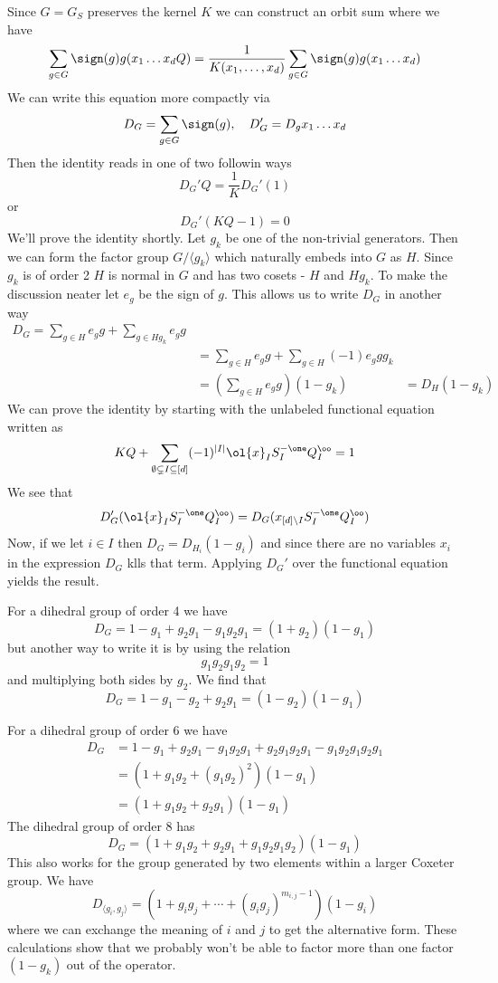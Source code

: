 Since $G = G_S$ preserves the kernel $K$ we can construct an orbit sum where we have
\[
	\sum_{g\in G} \sign(g) g(x_1\ldots x_d Q) = \frac{1}{K(x_1,\ldots,x_d)}\sum_{g\in G} \sign(g) g(x_1\ldots x_d)
\]
We can write this equation more compactly via
\[
	D_G = \sum_{g \in G}\sign(g), \quad D_G' = D_g x_1\ldots x_d
\]
Then the identity reads in one of two followin ways
\[
	D_G'Q = \frac{1}{K}D_G'(1)
\]
or
\[
	D_G'(KQ - 1) = 0
\]
We'll prove the identity shortly. Let $g_k$ be one of the non-trivial generators. Then we can form the factor group $G/\langle g_k \rangle$ which naturally embeds into $G$ as $H$. Since $g_k$ is of order 2 $H$ is normal in $G$ and has two cosets - $H$ and $Hg_k$. To make the discussion neater let $e_g$ be the sign of $g$. This allows us to write $D_G$ in another way
\begin{align*}
	D_G =\sum_{g \in H} e_g g + \sum_{g \in Hg_k} e_g g\\
	&=\sum_{g \in H} e_g g + \sum_{g \in H} (-1)e_g g g_k\\
	&= \left(\sum_{g \in H} e_g g\right)(1-g_k)
	&= D_H(1-g_k)
\end{align*}
We can prove the identity by starting with the unlabeled functional equation written as
\[
	KQ + \sum_{\emptyset \subsetneq I \subseteq [d]}(-1)^{|I|}\ol{x}_{I} S_I^{-\one} Q_I^{\oo} = 1
\]
We see that
\[
	D_G'(\ol{x}_{I} S_I^{-\one} Q_I^{\oo}) = D_G(x_{[d]\backslash I} S_I^{-\one} Q_I^{\oo})
\]
Now, if we let $i \in I$ then $D_G = D_{H_i}(1-g_i)$ and since there are no variables $x_i$ in the expression $D_G$ klls that term. Applying $D_G'$ over the functional equation yields the result.

For a dihedral group of order 4 we have
\[
	D_G = 1- g_1 +g_2 g_1 -g_1g_2g_1 = (1+g_2)(1-g_1)
\]
but another way to write it is by using the relation
\[
	g_1g_2g_1g_2 = 1
\]
and multiplying both sides by $g_2$. We find that
\[
	D_G = 1 - g_1 -g_2 + g_2 g_1 = (1-g_2)(1-g_1)
\]

For a dihedral group of order 6 we have
\begin{align*}
	D_G &= 1- g_1 + g_2 g_1 -g_1 g_2 g_1+g_2 g_1 g_2 g_1 -g_1 g_2 g_1 g_2 g_1 \\
	&= (1+g_1 g_2+(g_1 g_2)^2)(1-g_1)\\
	&=(1+g_1g_2+g_2g_1)(1-g_1)
\end{align*}
The dihedral group of order 8 has 
\[
	D_G = (1+g_1g_2+g_2g_1+g_1g_2g_1g_2)(1-g_1)
\]
This also works for the group generated by two elements within a larger Coxeter group. We have 
\[
	D_{\langle g_i,g_j\rangle} = (1+g_ig_j+\cdots + (g_ig_j)^{m_{i,j}-1})(1-g_i)
\]
where we can exchange the meaning of $i$ and $j$ to get the alternative form. These calculations show that we probably won't be able to factor more than one factor $(1-g_k)$ out of the operator.
